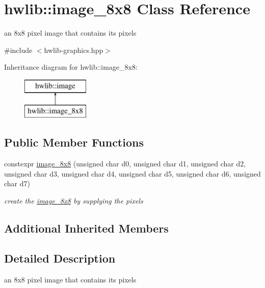 \hypertarget{classhwlib_1_1image__8x8}{}\section{hwlib\+:\+:image\+\_\+8x8 Class Reference}
\label{classhwlib_1_1image__8x8}


an 8x8 pixel image that contains its pixels  




{\ttfamily \#include $<$hwlib-\/graphics.\+hpp$>$}

Inheritance diagram for hwlib\+:\+:image\+\_\+8x8\+:\begin{figure}[H]
\begin{center}
\leavevmode
\includegraphics[height=2.000000cm]{classhwlib_1_1image__8x8}
\end{center}
\end{figure}
\subsection*{Public Member Functions}
\begin{DoxyCompactItemize}
\item 
constexpr \hyperlink{classhwlib_1_1image__8x8_a9384d60dbb742e96c3c03792545fbd56}{image\+\_\+8x8} (unsigned char d0, unsigned char d1, unsigned char d2, unsigned char d3, unsigned char d4, unsigned char d5, unsigned char d6, unsigned char d7)
\begin{DoxyCompactList}\small\item\em create the \hyperlink{classhwlib_1_1image__8x8}{image\+\_\+8x8} by supplying the pixels \end{DoxyCompactList}\end{DoxyCompactItemize}
\subsection*{Additional Inherited Members}


\subsection{Detailed Description}
an 8x8 pixel image that contains its pixels 

